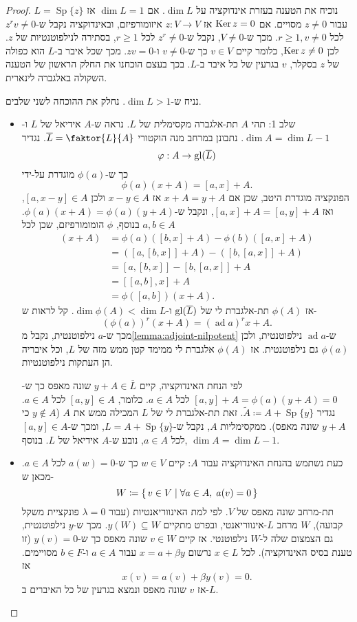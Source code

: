 \documentclass{report}
\theoremstyle{break}
\theoremstyle{MyNonumberbreak}
\newtheorem{proof}{הוכחה}
\DeclareMathOperator{\Sp}{Sp}
\DeclareMathOperator{\ad}{ad} %
\begin{document}
\begin{proof}
	נוכיח את הטענה בעזרת אינדוקציה על $\dim L$. אם $\dim L = 1$ אז $L = \Sp\{z\}$ עבור $z \neq 0$ מסויים. אם $\operatorname{Ker} z = 0$ אז $z : V \to V$ איזומורפיזם, ובאינדוקציה נקבל ש-$z^rv \neq 0$ לכל $r \ge 1, v \neq 0$. מכך ש-$V \neq 0$, נקבל ש-$z^r \neq 0$ לכל $r \ge 1$, בסתירה לנילפוטנטיות של $z$. לכן $\operatorname{Ker} z \neq 0$, כלומר קיים $v \in V$ כך ש-$v \neq 0$ ו-$zv = 0$. מכך שכל איבר ב-$L$ הוא כפולה של $z$ בסקלר, $v$ בגרעין של כל איבר ב-$L$. בכך בעצם הוכחנו את החלק הראשון של הטענה השקולה באלגברה לינארית.
	
	נניח ש-$\dim L > 1$. נחלק את ההוכחה לשני שלבים.
	\begin{itemize}
		\item 
		שלב 1: תהי $A$ תת-אלגברה מקסימלית של $L$. נראה ש-$A$ אידיאל של $L$ ו-$\dim A = \dim L - 1$. נתבונן במרחב מנה הוקטורי $\overline{L} = \faktor{L}{A}$. נגדיר
		\[ \varphi : A \to \operatorname{gl}(\overline{L}) \]
		כך ש-$\phi(a)$ מוגדרת על-ידי
		\[ \phi(a)(x + A) = [a, x] + A. \]
		הפונקציה מוגדרת היטב, שכן אם $x + A = y + A$ אז $x - y \in A$ ולכן $[a, x-y] \in A$, ואז $[a, x] + A = [a, y] + A$, ונקבל ש-$\phi(a)(x + A) = \phi(a)(y + A)$. בנוסף, $\phi$ הומומורפיזם, שכן לכל $a, b \in A$
		\begin{align*}
			[\phi(a), \phi(b)](x + A) &= \phi(a)([b, x] + A) - \phi(b)([a, x] + A) \\
				&= ([a, [b, x]] + A) - ([b, [a, x]] + A) \\
				&= [a, [b, x]] - [b, [a, x]] + A \\
				&= [[a, b], x] + A \\
				&= \phi([a, b])(x + A).
		\end{align*}
		אז $\phi(A)$ תת-אלגברת לי של $\operatorname{gl}(\overline{L})$ ו-$\dim \phi(A) < \dim L$. קל לראות ש-
		\[ (\phi(a))^r(x + A) = (\ad a)^r x + A. \]
		מכך ש-$a$ נילפוטנטית, נקבל מ\autoref*{lemma:adjoint-nilpotent} ש-$\ad a$ נילפוטנטית, ולכן $\phi(a)$ גם נילפוטנטית. אז $\phi(A)$ אלגברת לי ממימד קטן ממש מזה של $L$, וכל איבריה הן העתקות נילפוטנטיות.
		
		לפי הנחת האינדוקציה, קיים $y + A \in \overline{L}$ שונה מאפס כך ש-$[a, y] + A = \phi(a)(y + A) = 0$ לכל $a \in A$. כלומר, $[a, y] \in A$ לכל $a \in A$. נגדיר $\tilde{A} \coloneqq A + \Sp\{y\}$. זאת תת-אלגברת לי של $L$ המכילה ממש את $A$ ($y \notin A$ כי $y + A$ שונה מאפס). ממקסימליות $A$, נקבל ש-$L = A + \Sp\{y\}$, ומכך ש-$[a, y] \in A$ לכל $a \in A$, נובע ש-$A$ אידיאל של $L$. בנוסף, $\dim A = \dim L - 1$.
		\item
		כעת נשתמש בהנחת האינדוקציה עבור $A$: קיים $w \in V$ כך ש-$a(w) = 0$ לכל $a \in A$. מכאן ש-
		\[ W \coloneqq \set{v \in V | \forall a \in A, \; a(v) = 0} \]
		תת-מרחב שונה מאפס של $V$. לפי למת האינווריאנטיות (עבור $\lambda = 0$ פונקציית משקל קבועה), $W$ מרחב $L$-אינווריאנטי, ובפרט מתקיים $y(W) \subseteq W$. מכך ש-$y$ נילפוטנטית, גם הצמצום שלה ל-$W$ נילפוטנטי. אז קיים $v \in W$ שונה מאפס כך ש-$y(v) = 0$ (זו טענת בסיס האינדוקציה). לכל $x \in L$ נרשום $x = a + \beta y$ עבור $a \in A$ ו-$b \in F$ מסויימים. אז
		\[ x(v) = a(v) + \beta y(v) = 0. \]
		אז $v$ שונה מאפס ונמצא בגרעין של כל האיברים ב-$L$.
	\end{itemize}
\end{proof}
\end{document}
